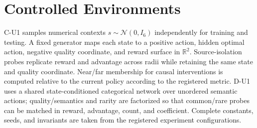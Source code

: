 \section{Controlled Environments}
\label{app:environments}

C-U1 samples numerical contexts $s\sim\mathcal N(0,I_6)$ independently for training and testing. A fixed generator maps each state to a positive action, hidden optimal action, negative quality coordinate, and reward surface in $\mathbb R^2$. Source-isolation probes replicate reward and advantage across radii while retaining the same state and quality coordinate. Near/far membership for causal interventions is computed relative to the current policy according to the registered metric. D-U1 uses a shared state-conditioned categorical network over unordered semantic actions; quality/semantics and rarity are factorized so that common/rare probes can be matched in reward, advantage, count, and coefficient. Complete constants, seeds, and invariants are taken from the registered experiment configurations.
